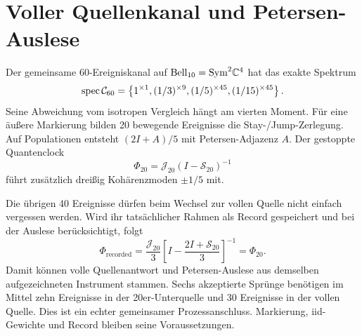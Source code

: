 \section{Voller Quellenkanal und Petersen-Auslese}
Der gemeinsame 60-Ereigniskanal auf $\mathrm{Bell}_{10}=\mathrm{Sym}^2\mathbb C^4$ hat das exakte Spektrum
\[
 \operatorname{spec}\mathcal C_{60}=\left\{1^{\times1},
 (1/3)^{\times9},(1/5)^{\times45},(1/15)^{\times45}\right\}.
\]
Seine Abweichung vom isotropen Vergleich hängt am vierten Moment. Für eine äußere Markierung bilden 20 bewegende Ereignisse die Stay-/Jump-Zerlegung. Auf Populationen entsteht $(2I+A)/5$ mit Petersen-Adjazenz $A$. Der gestoppte Quantenclock
\[
 \Phi_{20}=\mathcal J_{20}(I-\mathcal S_{20})^{-1}
\]
führt zusätzlich dreißig Kohärenzmoden $\pm1/5$ mit. 

Die übrigen 40 Ereignisse dürfen beim Wechsel zur vollen Quelle nicht einfach vergessen werden. Wird ihr tatsächlicher Rahmen als Record gespeichert und bei der Auslese berücksichtigt, folgt
\[
 \Phi_{\mathrm{recorded}}=
 \frac{\mathcal J_{20}}3
 \left[I-\frac{2I+\mathcal S_{20}}3\right]^{-1}
 =\Phi_{20}.
\]
Damit können volle Quellenantwort und Petersen-Auslese aus demselben aufgezeichneten Instrument stammen. Sechs akzeptierte Sprünge benötigen im Mittel zehn Ereignisse in der 20er-Unterquelle und 30 Ereignisse in der vollen Quelle. Dies ist ein echter gemeinsamer Prozessanschluss. Markierung, iid-Gewichte und Record bleiben seine Voraussetzungen. 

